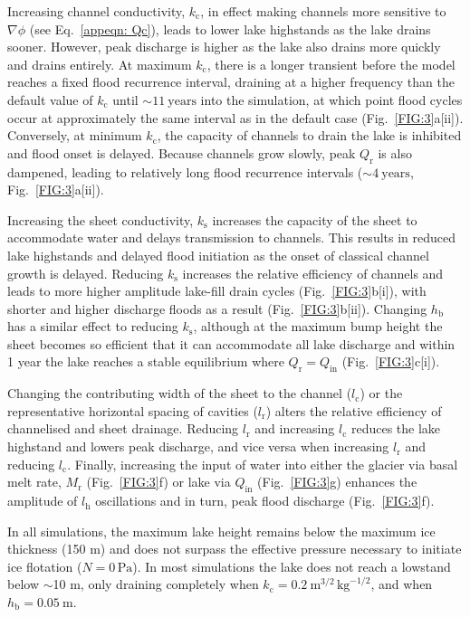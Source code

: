 \documentclass[tc, manuscript]{copernicus}
\begin{document}
Increasing channel conductivity, $k_{\mathrm{c}}$, in effect making channels more sensitive to $\nabla \phi$ (see Eq.~\ref{appeqn: Qc}), leads to lower lake highstands as the lake drains sooner. However, peak discharge is higher as the lake also drains more quickly and drains entirely. At maximum $k_{\mathrm{c}}$, there is a longer transient before the model reaches a fixed flood recurrence interval, draining at a higher frequency than the default value of $k_{\mathrm{c}}$ until $\sim 11 \ \mathrm{years}$ into the simulation, at which point flood cycles occur at approximately the same interval as in the default case (Fig.~\ref{FIG:3}a[ii]). Conversely, at minimum $k_{\mathrm{c}}$, the capacity of channels to drain the lake is inhibited and flood onset is delayed. Because channels grow slowly, peak $Q_{\mathrm{r}}$ is also dampened, leading to relatively long flood recurrence intervals ($\sim 4\ \mathrm{years}$, Fig.~\ref{FIG:3}a[ii]).

Increasing the sheet conductivity, $k_{\mathrm{s}}$ increases the capacity of the sheet to accommodate water and delays transmission to channels. This results in reduced lake highstands and delayed flood initiation as the onset of classical channel growth is delayed. Reducing $k_{\mathrm{s}}$ increases the relative efficiency of channels and leads to more higher amplitude lake-fill drain cycles (Fig.~\ref{FIG:3}b[i]), with shorter and higher discharge floods as a result (Fig.~\ref{FIG:3}b[ii]). Changing $h_{\mathrm{b}}$ has a similar effect to reducing $k_{\mathrm{s}}$, although at the maximum bump height the sheet becomes so efficient that it can accommodate all lake discharge and within 1 year the lake reaches a stable equilibrium where $Q_{\mathrm{r}} = Q_{\mathrm{in}}$ (Fig.~\ref{FIG:3}c[i]). 

Changing the contributing width of the sheet to the channel ($l_{\mathrm{c}}$) or the representative horizontal spacing of cavities ($l_{\mathrm{r}}$) alters the relative efficiency of channelised and sheet drainage. Reducing $l_{\mathrm{r}}$ and increasing $l_{\mathrm{c}}$ reduces the lake highstand and lowers peak discharge, and vice versa when increasing $l_{\mathrm{r}}$ and reducing $l_{\mathrm{c}}$. Finally, increasing the input of water into either the glacier via basal melt rate, $M_{\mathrm{r}}$ (Fig.~\ref{FIG:3}f) or lake via $Q_{\mathrm{in}}$ (Fig.~\ref{FIG:3}g) enhances the amplitude of $l_{\mathrm{h}}$ oscillations and in turn, peak flood discharge (Fig.~\ref{FIG:3}f). 

In all simulations, the maximum lake height remains below the maximum ice thickness (150 m) and does not surpass the effective pressure necessary to initiate ice flotation ($N=0\, \mathrm{Pa}$). In most simulations the lake does not reach a lowstand below $\sim$10 m, only draining completely when $k_{\mathrm{c}} = 0.2 \ \mathrm{m}^{3/2}\, \mathrm{kg}^{-1/2}$, and when $h_{\mathrm{b}}=0.05\ \mathrm{m}$.
\end{document}
